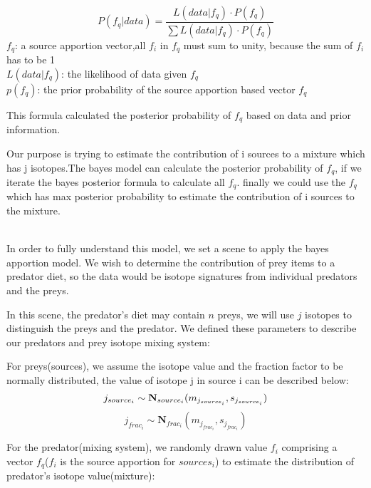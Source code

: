 \documentclass{article}
\begin{document}
\begin{displaymath}
P(f_{q}|data) = \frac{L(data|f_{q})\cdotp P(f_{q})}{\sum L(data|f_{q})\cdotp P(f_{q})}
\end{displaymath}
$f_{q}$: a source apportion vector,all $f_{i}$ in $f_{q}$ must sum to unity, because the sum of $f_{i}$ has to be 1\\
$L(data|f_{q})$: the likelihood of data given $f_{q}$\\
$p(f_{q})$: the prior probability of the source apportion based vector $f_{q}$\\
\par This formula calculated the posterior probability of $f_{q}$ based on data and prior information.\\
\par Our purpose is trying to estimate the contribution of i sources to a mixture which has j isotopes.The bayes model can calculate the posterior probability of $f_{q}$, if we iterate the bayes posterior formula to calculate all $f_{q}$. finally we could use the $f_{q}$ which has max  posterior probability to estimate the contribution of i sources to the mixture.\\
\\
\par In order to fully understand this model, we set a scene to apply the bayes apportion model.
We wish to determine the contribution of prey items to a predator diet, so the data would be isotope signatures from individual
predators and the preys.\\
\par In this scene, the predator's diet may contain $n$ preys, we will use $j$ isotopes to distinguish the preys and the predator.
We defined these parameters to describe our predators and prey isotope mixing system:\\
\par For preys(sources), we assume the isotope value and the fraction factor to be normally distributed, the value of isotope j in source i can be described below:\\
\begin{displaymath}
j_{source_{i}}\sim\textbf{N}_{source_{i}}(m_{j_{source_{i}}}, s_{j_{source_{i}}})\\
\end{displaymath}
\begin{displaymath}
j_{frac_{i}}\sim\textbf{N}_{frac_{i}}(m_{j_{frac_{i}}}, s_{j_{frac_{i}}})
\end{displaymath}
\par For the predator(mixing system), we randomly drawn value $f_{i}$ comprising a vector $f_{q}$($f_{i}$ is the source apportion for $sources_{i}$) to estimate the distribution of predator's isotope value(mixture):\\
\end{document}
